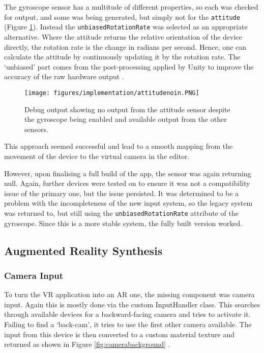 \documentclass[12pt, a4paper]{article}
\begin{document}
The gyroscope sensor has a multitude of different properties, so each was checked for output, and some was being generated, but simply not for the \verb|attitude| (Figure \ref{fig:attitudezeros}). Instead the \verb|unbiasedRotationRate| was selected as an appropriate alternative. Where the attitude returns the relative orientation of the device directly, the rotation rate is the change in radians per second. Hence, one can calculate the attitude by continuously updating it by the rotation rate. The `unbiased' part comes from the post-processing applied by Unity to improve the accuracy of the raw hardware output \cite{movement:rotationrate}. 

\begin{figure}[]
    \centering
    \texttt{[image: figures/implementation/attitudenoin.PNG]}
        \caption{Debug output showing no output from the attitude sensor despite the gyroscope being enabled and available output from the other sensors.}
        \label{fig:attitudezeros}
\end{figure}

This approach seemed successful and lead to a smooth mapping from the movement of the device to the virtual camera in the editor. 

However, upon finalising a full build of the app, the sensor was again returning null. Again, further devices were tested on to ensure it was not a compatibility issue of the primary one, but the issue persisted. It was determined to be a problem with the incompleteness of the new input system, so the legacy system was returned to, but still using the \verb|unbiasedRotationRate| attribute of the gyroscope. Since this is a more stable system, the fully built version worked. 

\subsection{Augmented Reality Synthesis}
\label{augmentedrealitysynthesis}

\subsubsection{Camera Input}
To turn the VR application into an AR one, the missing component was camera input. Again this is mostly done via the custom InputHandler class. This searches through available devices for a backward-facing camera and tries to activate it. Failing to find a `back-cam', it tries to use the first other camera available. The input from this device is then converted to a custom material texture and returned as shown in Figure \ref{fig:camerabackground} \cite{arsynthesis:cameratutorial}.
\end{document}
